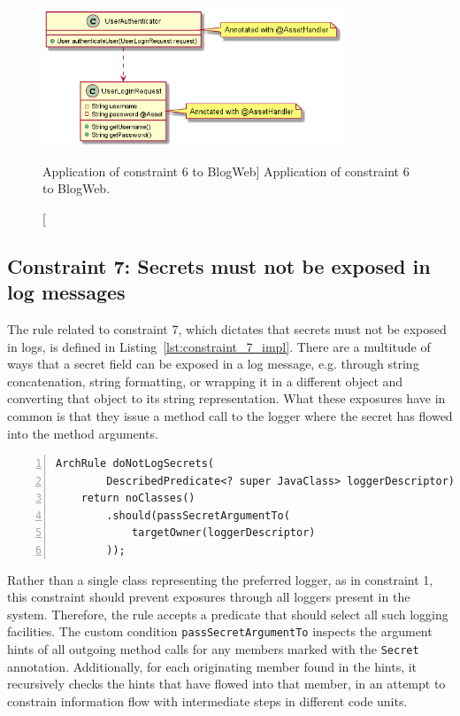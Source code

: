 \begin{figure}[ht]
    \centering
    \includegraphics[width=0.8\textwidth]{figure/toyexamples/Assets.png}
    \caption
        [Application of constraint 6 to BlogWeb]
        {Application of constraint 6 to BlogWeb.}
    \label{fig:assets_toy_system}
\end{figure}

\subsection{Constraint 7: Secrets must not be exposed in log messages}
The rule related to constraint 7, which dictates that secrets must not be exposed in logs, is defined in Listing~\ref{lst:constraint_7_impl}.
There are a multitude of ways that a secret field can be exposed in a log message, e.g. through string concatenation, string formatting, or wrapping it in a different object and converting that object to its string representation. What these exposures have in common is that they issue a method call to the logger where the secret has flowed into the method arguments.

\begin{minipage}{\linewidth}
\begin{lstlisting}[caption={Rule definition for constraint 7.}, captionpos=b, label=lst:constraint_7_impl, numbers=left]
ArchRule doNotLogSecrets(
        DescribedPredicate<? super JavaClass> loggerDescriptor) {
    return noClasses()
        .should(passSecretArgumentTo(
            targetOwner(loggerDescriptor)
        ));
\end{lstlisting}
\end{minipage}

Rather than a single class representing the preferred logger, as in constraint 1, this constraint should prevent exposures through all loggers present in the system. Therefore, the rule accepts a predicate that should select all such logging facilities. The custom condition \texttt{passSecretArgumentTo} inspects the argument hints of all outgoing method calls for any members marked with the \texttt{Secret} annotation. Additionally, for each originating member found in the hints, it recursively checks the hints that have flowed into that member, in an attempt to constrain information flow with intermediate steps in different code units.

